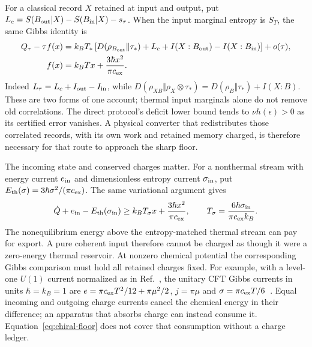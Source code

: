 \documentclass[12pt,a4paper]{article}
\begin{document}
For a classical record $X$ retained at input and output, put
$L_c=S(B_{\rm out}|X)-S(B_{\rm in}|X)-s_\tau$. When the input marginal
entropy is $S_T$, the same Gibbs identity is
\begin{equation}
 \begin{aligned}
 Q_\tau-\tau f(x)
 &=k_BT_*\left[D(\rho_{B_{\rm out}}\Vert\tau_*)+L_c
       +I(X:B_{\rm out})-I(X:B_{\rm in})\right]+o(\tau),\\
 f(x)&=k_BTx+\frac{3\hbar x^2}{\pi c_{\rm ex}}.
 \end{aligned}
 \label{eq:conditional-export-ledger}
\end{equation}
Indeed $L_\tau=L_c+I_{\rm out}-I_{\rm in}$, while
$D(\rho_{XB}\Vert\rho_X\otimes\tau_*)
=D(\rho_B\Vert\tau_*)+I(X:B)$. These are two forms of one account;
thermal input marginals alone do not remove old correlations.
The direct protocol's deficit lower bound tends to
$\nu h(\epsilon)>0$ as its certified error vanishes. A physical
converter that redistributes those correlated records, with its own
work and retained memory charged, is therefore necessary for that
route to approach the sharp floor.

The incoming state and conserved charges matter. For a nonthermal stream with
energy current $e_{\rm in}$ and dimensionless entropy current $\sigma_{\rm in}$,
put $E_{\rm th}(\sigma)=3\hbar\sigma^2/(\pi c_{\rm ex})$. The same variational
argument gives
\begin{equation}\label{eq:nonthermal-exhaust}
 \dot Q+e_{\rm in}-E_{\rm th}(\sigma_{\rm in})
 \ge k_BT_\sigma x+\frac{3\hbar x^2}{\pi c_{\rm ex}},
 \qquad T_\sigma=\frac{6\hbar\sigma_{\rm in}}{\pi c_{\rm ex}k_B}.
\end{equation}
The nonequilibrium energy above the entropy-matched thermal stream can pay for
export. A pure coherent input therefore cannot be charged as though it were a
zero-energy thermal reservoir. At nonzero chemical potential the corresponding
Gibbs comparison must hold all retained charges fixed. For example, with a
level-one $U(1)$ current normalized as in Ref.~\cite[Eq.~(84)]{BernardDoyon2015},
the unitary CFT Gibbs currents in units $\hbar=k_B=1$ are
$e=\pi c_{\rm ex}T^2/12+\pi\mu^2/2$, $j=\pi\mu$ and
$\sigma=\pi c_{\rm ex}T/6$~\cite[Eq.~(93)]{BernardDoyon2015}.
Equal incoming and outgoing charge currents cancel the chemical energy in their
difference; an apparatus that absorbs charge can instead consume it.
Equation~\eqref{eq:chiral-floor} does not cover that consumption without a charge
ledger.
\end{document}
